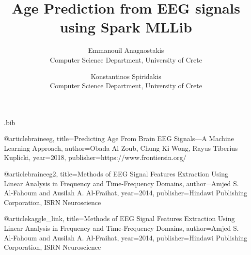 \usepackage{filecontents}

\usepackage{graphicx}
\graphicspath{{./}}

\begin{filecontents}{\jobname.bib}


@article{braineeg,
  title={Predicting Age From Brain EEG Signals—A Machine Learning Approach},
  author={Obada Al Zoub, Chung Ki Wong, Rayus Tiberius Kuplicki},
  year={2018},
  publisher={https://www.frontiersin.org/}
}

@article{braineeg2,
  title={Methods of EEG Signal Features Extraction Using Linear Analysis in Frequency and Time-Frequency Domains},
  author={Amjed S. Al-Fahoum and Ausilah A. Al-Fraihat},
  year={2014},
  publisher={Hindawi Publishing Corporation, ISRN Neuroscience}
}

@article{kaggle_link,
  title={Methods of EEG Signal Features Extraction Using Linear Analysis in Frequency and Time-Frequency Domains},
  author={Amjed S. Al-Fahoum and Ausilah A. Al-Fraihat},
  year={2014},
  publisher={Hindawi Publishing Corporation, ISRN Neuroscience}
}


\end{filecontents}



\date{}

\title{\Large \bf Age Prediction from EEG signals using Spark MLLib}

\author{
{\rm Emmanouil Anagnostakis}\\
Computer Science Department, University of Crete
\and
{\rm Konstantinos Spiridakis}\\
Computer Science Department, University of Crete
} %

\maketitle

